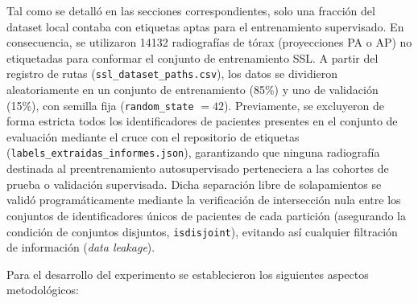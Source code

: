 \documentclass[../main.tex]{subfiles}
\begin{document}
Tal como se detalló en las secciones correspondientes, solo una fracción del dataset local contaba con etiquetas aptas para el entrenamiento supervisado. En consecuencia, se utilizaron 14132 radiografías de tórax (proyecciones PA o AP) no etiquetadas para conformar el conjunto de entrenamiento SSL. A partir del registro de rutas (\texttt{ssl\_dataset\_paths.csv}), los datos se dividieron aleatoriamente en un conjunto de entrenamiento (85\%) y uno de validación (15\%), con semilla fija (\texttt{random\_state} $= 42$). Previamente, se excluyeron de forma estricta todos los identificadores de pacientes presentes en el conjunto de evaluación mediante el cruce con el repositorio de etiquetas (\texttt{labels\_extraidas\_informes.json}), garantizando que ninguna radiografía destinada al preentrenamiento autosupervisado perteneciera a las cohortes de prueba o validación supervisada. Dicha separación libre de solapamientos se validó programáticamente mediante la verificación de intersección nula entre los conjuntos de identificadores únicos de pacientes de cada partición (asegurando la condición de conjuntos disjuntos, \texttt{isdisjoint}), evitando así cualquier filtración de información (\textit{data leakage}).

Para el desarrollo del experimento se establecieron los siguientes aspectos metodológicos:
\end{document}
